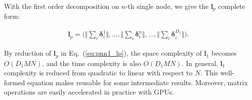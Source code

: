 \documentclass[conference]{IEEEtran}
\newcommand{\bs}{\boldsymbol}
\newcommand{\bl}{\bs{l}}
\newcommand{\bp}{\bs{p}}
\newcommand{\Bf}{\bs{f}}
\newcommand{\mR}{\mathbb{R}}
\newcommand{\weinan}[1]{{\bf \color{red} [[Weinan says ``#1'']]}}
\begin{document}
With the first order decomposition on $n$-th single node, we give the $\bl_p$ complete form:

\begin{equation}\label{eq:pnn1_lp}
\begin{split}
\bl_p = \Big( \Vert \sum_i \bs\delta_i^1 \Vert, \ldots, \Vert \sum_i \bs\delta_i^{n} \Vert, \ldots, \Vert \sum_i \bs\delta_i^{D_1} \Vert \Big).
\end{split}
\end{equation}


By reduction of $\bl_p$ in Eq.~(\ref{eq:pnn1_lp}), the space complexity of $\bl_1$ becomes $O(D_1MN)$, and the time complexity is also $O(D_1MN)$. In general, $\bl_1$ complexity is reduced from quadratic to linear with respect to $N$. This well-formed equation makes reusable for some intermediate results. Moreover, matrix operations are easily accelerated in practice with GPUs.
\end{document}
